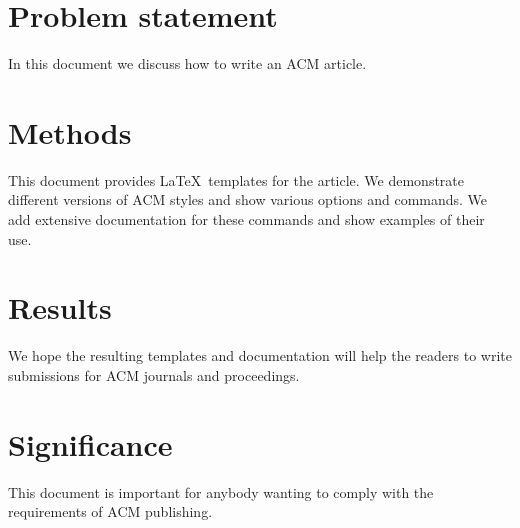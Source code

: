 \documentclass[acmcp]{acmart}
\begin{document}
\maketitle

\section{Problem statement}

In this document we discuss how to write an ACM article.

\section{Methods}

This document provides \LaTeX\ templates for the article. We
demonstrate different versions of ACM styles and show various options
and commands.  We add extensive documentation for these commands and
show examples of their use.

\section{Results}

We hope the resulting templates and documentation will help the
readers to write submissions for ACM journals and proceedings.

\section{Significance}

This document is important for anybody wanting to comply with the
requirements of ACM publishing.
\end{document}
